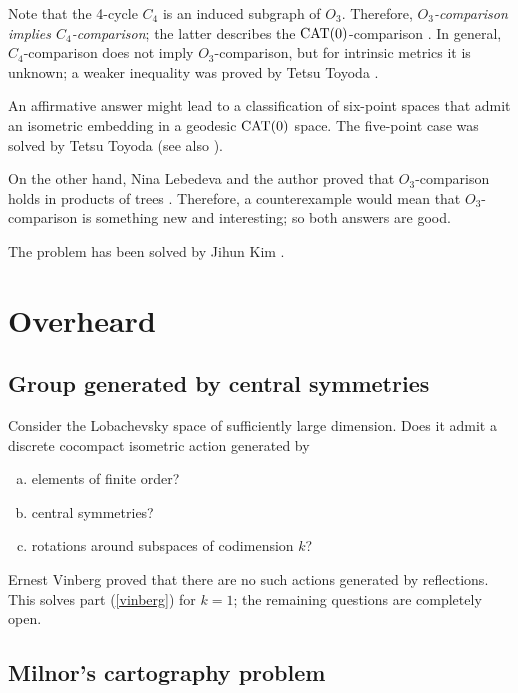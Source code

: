 Note that the 4-cycle $C_4$ is an induced subgraph of $O_3$.
Therefore, \textit{$O_3$-comparison implies $C_4$-comparison};
the latter describes the $\operatorname{\rm CAT}\nolimits(0)$-comparison \cite{akp}.
In general, $C_4$-comparison does not imply $O_3$-comparison,
but for intrinsic metrics it is unknown; a weaker inequality was proved by Tetsu Toyoda \cite{toyoda2025}.

An affirmative answer might lead to a classification of six-point spaces that admit an isometric embedding in a geodesic $\operatorname{\rm CAT}\nolimits(0)$ space.
The five-point case was solved by Tetsu Toyoda \cite{toyoda2020} (see also \cite{lebedeva-petrunin2021}).

On the other hand, Nina Lebedeva and the author proved that $O_3$-comparison holds in products of trees \cite{lebedeva-petrunin2025}.
Therefore, a counterexample would mean that $O_3$-comparison is something new and interesting;
so both answers are good.

The problem has been solved by Jihun Kim \cite{kim2026}.

\section*{Overheard}

\subsection{Group generated by central symmetries}
\label{Group generated by central symmetries}

\begin{pr}
Consider the Lobachevsky space of sufficiently large dimension.
Does it admit a discrete cocompact isometric action generated by
\begin{enumerate}[(a)]
 \item elements of finite order?
 \item central symmetries?
 \item\label{vinberg} rotations around subspaces of codimension $k$?
\end{enumerate}

\end{pr}

Ernest Vinberg \cite{vinberg, vinberg-strong} proved that there are no such actions generated by reflections.
This solves part (\ref{vinberg}) for $k=1$; the remaining questions are completely open.

\subsection{Milnor's cartography problem}
\label{Milnor's cartography problem}


